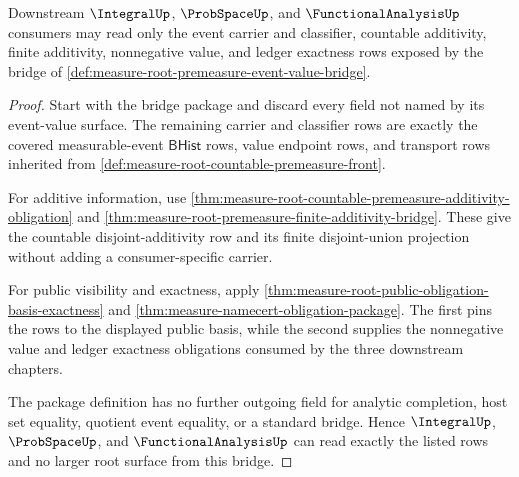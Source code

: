 \begin{theorem}
\label{thm:measure-root-premeasure-downstream-threshold-bridge}
Downstream $\IntegralUp$, $\ProbSpaceUp$, and $\FunctionalAnalysisUp$
consumers may read only the event carrier and classifier, countable
additivity, finite additivity, nonnegative value, and ledger exactness rows
exposed by the bridge of
\autoref{def:measure-root-premeasure-event-value-bridge}.
\end{theorem}
\begin{proof}
Start with the bridge package and discard every field not named by its
event-value surface. The remaining carrier and classifier rows are exactly
the covered measurable-event $\mathsf{BHist}$ rows, value endpoint rows, and
transport rows inherited from
\autoref{def:measure-root-countable-premeasure-front}.

For additive information, use
\autoref{thm:measure-root-countable-premeasure-additivity-obligation} and
\autoref{thm:measure-root-premeasure-finite-additivity-bridge}. These give
the countable disjoint-additivity row and its finite disjoint-union
projection without adding a consumer-specific carrier.

For public visibility and exactness, apply
\autoref{thm:measure-root-public-obligation-basis-exactness} and
\autoref{thm:measure-namecert-obligation-package}. The first pins the rows
to the displayed public basis, while the second supplies the nonnegative
value and ledger exactness obligations consumed by the three downstream
chapters.

The package definition has no further outgoing field for analytic completion,
host set equality, quotient event equality, or a standard bridge. Hence
$\IntegralUp$, $\ProbSpaceUp$, and $\FunctionalAnalysisUp$ can read exactly
the listed rows and no larger root surface from this bridge.
\end{proof}
